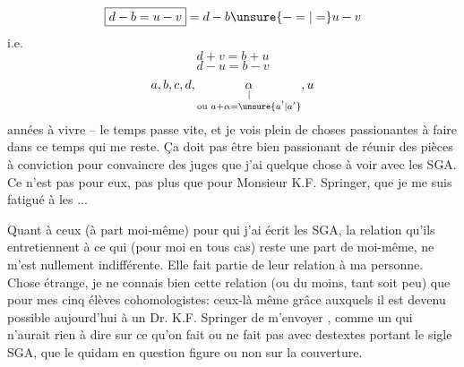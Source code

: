 
\[\boxed{d-b=u-v}=d-b\unsure{-=|=}u-v\]
i.e.
\[d+v=b+u\]
\[d-u=b-v\]
\[
a,b,c,d,\underset{\substack{|\\\text{ou }a+\alpha=\unsure{a^!|a'}}}{\alpha},u
\]
années à vivre -- le temps passe vite, et je vois plein de choses passionantes à faire dans ce temps qui me reste. Ça  doit pas être bien passionant de réunir des pièces à conviction pour convaincre des juges que j'ai quelque chose à voir avec les SGA. Ce n'est pas pour eux, pas plus que pour Monsieur K.F. Springer, que je me suis fatigué à les  ...

Quant à ceux (à part moi-même) pour qui j'ai écrit les SGA, la relation qu'ils entretiennent à ce qui (pour moi en tous cas) reste une part de moi-même, ne m'est nullement indifférente. Elle fait partie de leur relation à ma personne. Chose étrange, je ne connais bien cette relation (ou du moins, tant soit peu) que pour mes cinq élèves cohomologistes: ceux-là même grâce auxquels il est devenu possible aujourd'hui  à un Dr. K.F. Springer de m'envoyer , comme un  qui n'aurait rien à dire sur ce qu'on fait ou ne fait pas avec des\inserted{ }textes portant le sigle SGA, que le quidam en question figure ou non sur la couverture.

